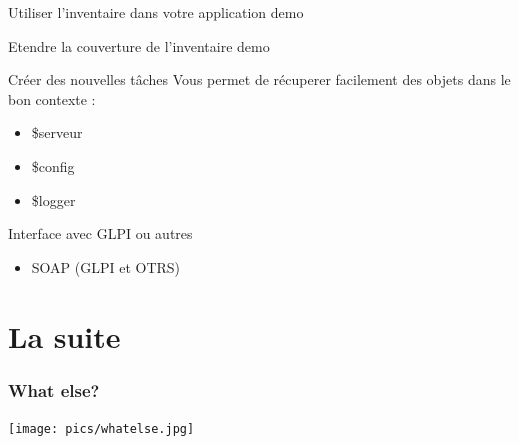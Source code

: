 \documentclass{beamer}
\begin{document}
\begin{frame}

    \begin{block}{Utiliser l'inventaire dans votre application}
    demo
    \end{block}

\end{frame}


\begin{frame}

    \begin{block}{Etendre la couverture de l'inventaire}
    demo
    \end{block}

\end{frame}

\begin{frame}

    \begin{block}{Créer des nouvelles tâches}
    Vous permet de récuperer facilement des objets dans le bon contexte :
    \begin{itemize}
      \item \$serveur
      \item \$config
      \item \$logger 
    \end{itemize}
    \end{block}

\end{frame}

\begin{frame}

    \begin{block}{Interface avec GLPI ou autres}
        \begin{itemize}
            \item SOAP (GLPI et OTRS)
        \end{itemize}
    \end{block}

\end{frame}

\section{La suite}

\begin{frame}
    \frametitle{What else?}

    \begin{center}
    \texttt{[image: pics/whatelse.jpg]}
    \end{center}

\end{frame}
\end{document}
